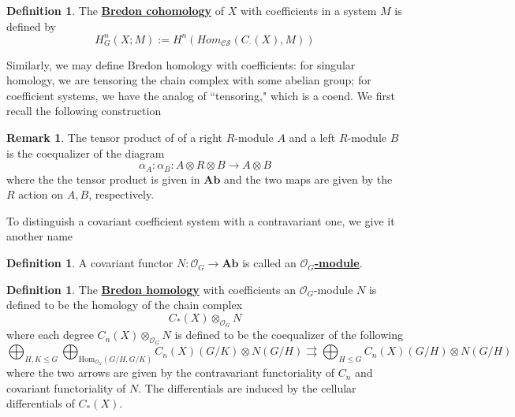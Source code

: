 \documentclass{article}
\theoremstyle{definition}
\newtheorem{definition}[theorem]{Definition}
\newtheorem{remark}[theorem]{Remark}
\begin{document}
\begin{tcolorbox}[colback=purple!5!white,colframe=purple!75!black]
\begin{definition}
The \underline{\textbf{Bredon cohomology}} of $X$ with coefficients in a system $M$ is defined by 
\[H_G^n(X;M):=H^n(Hom_{\mathcal{CS}}(C_{\cdot}(X),M))\]
\end{definition}
\end{tcolorbox}

Similarly, we may define Bredon homology with coefficients: for singular homology, we are tensoring the chain complex with some abelian group; for coefficient systems, we have the analog of ``tensoring," which is a coend. We first recall the following construction


\begin{tcolorbox}[colback=green!5!white,colframe=green!30!white]
\begin{remark}
The tensor product of of a right $R$-module $A$ and a left $R$-module $B$ is the coequalizer of the diagram 
\[\alpha_A:\alpha_B: A\otimes R\otimes B\to A\otimes B\]
where the the tensor product is given in $\textbf{Ab}$ and the two maps are given by the $R$ action on $A,B$, respectively.
\end{remark}
\end{tcolorbox}

To distinguish a covariant coefficient system with a contravariant one, we give it another name
\begin{tcolorbox}[colback=purple!5!white,colframe=purple!75!black]
\begin{definition}
A covariant functor $N: \mathcal{O}_G\to \textbf{Ab}$ is called an \underline{$\mathcal{O}_G$\textbf{-module}}.
\end{definition}
\end{tcolorbox}

\begin{tcolorbox}[colback=purple!5!white,colframe=purple!75!black]
\begin{definition}
The \underline{\textbf{Bredon homology}} with coefficients an $\mathcal{O}_G$-module $N$ is defined to be the homology of the chain complex 
\[C_*(X)\otimes_{\mathcal{O}_G} N\]
where each degree $C_n(X)\otimes_{\mathcal{O}_G} N$ is defined to be the coequalizer of the following
\[ \bigoplus_{H,K\leq G}\bigoplus_{\textrm{Hom}_{\mathcal{O}_G}(G/H,G/K)}C_n(X)(G/K)\otimes N(G/H)\rightrightarrows \bigoplus_{H\leq G}C_n(X)(G/H)\otimes N(G/H) \]
where the two arrows are given by the contravariant functoriality of $C_n$ and covariant functoriality of $N$. The differentials are induced by the cellular differentials of $C_*(X)$.

\end{definition}
\end{tcolorbox}
\end{document}
